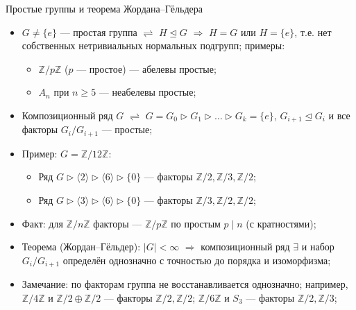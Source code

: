 \documentclass[serif, aspectratio=169]{beamer}
\begin{document}
\begin{frame}{Простые группы и теорема Жордана--Гёльдера}
    \begin{itemize}
        \item $G\neq \{e\}$ --- простая группа $\rightleftharpoons$ $H\trianglelefteq G$ $\Rightarrow$ $H=G$ или $H=\{e\}$, т.е. нет собственных нетривиальных нормальных подгрупп; примеры:
        \begin{itemize}
            \item $\mathbb{Z}/p\mathbb{Z}$ ($p$ --- простое) --- абелевы простые;
            \item $A_n$ при $n\ge5$ --- неабелевы простые;
        \end{itemize}
        \item Композиционный ряд $G$ $\rightleftharpoons$ $G=G_0\rhd G_1\rhd\dots\rhd G_k=\{e\}$, $G_{i+1}\trianglelefteq G_i$ и все факторы $G_i/G_{i+1}$ --- простые;
        \item Пример: $G=\mathbb{Z}/12\mathbb{Z}$:
        \begin{itemize}[<.->]
            \item Ряд $G\rhd\langle2\rangle\rhd\langle6\rangle\rhd\{0\}$ --- факторы $\mathbb{Z}/2,\mathbb{Z}/3,\mathbb{Z}/2$;
            \item Ряд $G\rhd\langle3\rangle\rhd\langle6\rangle\rhd\{0\}$ --- факторы $\mathbb{Z}/3,\mathbb{Z}/2,\mathbb{Z}/2$;
        \end{itemize}
        \item Факт: для $\mathbb{Z}/n\mathbb{Z}$ факторы --- $\mathbb{Z}/p\mathbb{Z}$ по простым $p\mid n$ (с кратностями);
        \item Теорема (Жордан--Гёльдер): $|G|<\infty$ $\Rightarrow$ композиционный ряд $\exists$ и набор $G_i/G_{i+1}$ определён однозначно с точностью до порядка и изоморфизма;
        \item Замечание: по факторам группа не восстанавливается однозначно; например, $\mathbb{Z}/4\mathbb{Z}$ и $\mathbb{Z}/2\oplus\mathbb{Z}/2$ --- факторы $\mathbb{Z}/2,\mathbb{Z}/2$; $\mathbb{Z}/6\mathbb{Z}$ и $S_3$ --- факторы $\mathbb{Z}/2,\mathbb{Z}/3$;
    \end{itemize}
\end{frame}
\end{document}
